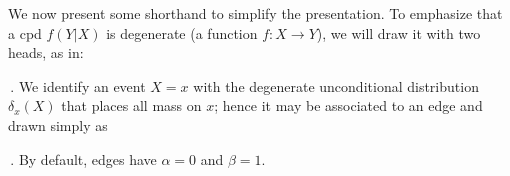 \documentclass[twoside]{article}
\theoremstyle{plain}
\theoremstyle{definition}
\newcommand{\mat}[1]{\mathbf{#1}}
\newcommand{\ssub}[1]{_{\!_{#1}\!}}
\newcommand{\bp}[1][L]{\mat{p}\ssub{#1}}
\newcommand{\dg}[1]{\mathbdcal{#1}}
\begin{document}
We now present some shorthand to simplify the presentation.
To emphasize that a cpd $f(Y|X)$ is degenerate
(a function $f:X\to Y$),
we will draw it with two heads, as in:
\,.
We identify an event $X\!\!=\!x$ with
the degenerate unconditional distribution $\delta_x(X)$ that places all mass on $x$;
hence it may be associated to an edge and drawn simply as
\,.
By default, edges have $\alpha = 0$ and $\beta = 1$.
\end{document}
